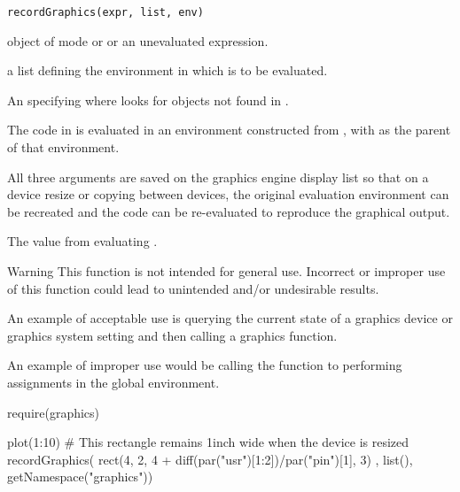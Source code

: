 %
\begin{Usage}
\begin{verbatim}
recordGraphics(expr, list, env)
\end{verbatim}
\end{Usage}
%
\begin{Arguments}
\begin{ldescription}
\item[\code{expr}] object of mode  or  or
an unevaluated expression.
\item[\code{list}] a list defining the environment in which  is to
be evaluated.
\item[\code{env}] An  specifying
where \R{} looks for objects not found in
.
\end{ldescription}
\end{Arguments}
%
\begin{Details}\relax
The code in  is evaluated in an environment constructed
from , with  as the parent of that environment.

All three arguments are saved on the graphics engine display list
so that on a device resize or copying between devices, the original
evaluation environment can be recreated and the code can be
re-evaluated to reproduce the graphical output.
\end{Details}
%
\begin{Value}
The value from evaluating .
\end{Value}
%
\begin{Section}{Warning}
This function is not intended for general use.  Incorrect or
improper use of this function could lead to unintended and/or
undesirable results.

An example of acceptable use is querying the current state
of a graphics device or graphics system setting and then
calling a graphics function.

An example of improper use would be calling the  function
to performing assignments in the global environment.
\end{Section}
%
\begin{SeeAlso}\relax
{} 
\end{SeeAlso}
%
\begin{Examples}
\begin{ExampleCode}
require(graphics)

plot(1:10)
# This rectangle remains 1inch wide when the device is resized
recordGraphics(
  {
    rect(4, 2,
         4 + diff(par("usr")[1:2])/par("pin")[1], 3)
  },
  list(),
  getNamespace("graphics"))
\end{ExampleCode}
\end{Examples}
